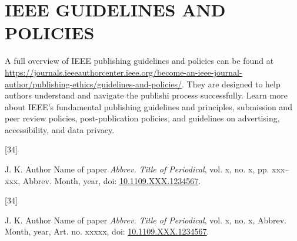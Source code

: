 \documentclass{IEEEtaes}
\begin{document}
\section{IEEE GUIDELINES AND POLICIES}

A full overview of IEEE publishing guidelines and policies can be found
at \href{https://journals.ieeeauthorcenter.ieee.org/become-an-ieee-journal-author/publishing-ethics/guidelines-and-policies/}{\url{https://journals.ieeeauthorcenter.ieee.org/become-an-ieee-journal-author/publishing-ethics/guidelines-and-policies/}}. They are designed to help authors understand and navigate the publishi process successfully. Learn more about IEEE's fundamental publishing guidelines and principles, submission and peer review policies, post-publication policies, and guidelines on advertising, accessibility, and data privacy.


\vspace*{-12pt}
\def\refname{}
\begin{thebibliography}{[34]}
\item[]  J. K. Author
\newblock Name of paper
\newblock \emph{Abbrev. Title of Periodical}, vol. x, no. x, pp. xxx--xxx, Abbrev. Month, year, doi: \href{https://dx.doi.org/10.1109.XXX.1234567}{10.1109.XXX.1234567}.
\end{thebibliography}

\def\refname{}
\begin{thebibliography}{[34]}\vspace*{-12pt}
\item[] J. K. Author
\newblock Name of paper
\newblock \emph{Abbrev. Title of Periodical}, vol. x, no. x, Abbrev. Month, year, Art. no. xxxxx, doi: \href{https://dx.doi.org/10.1109.XXX.1234567}{10.1109.XXX.1234567}.
\end{thebibliography}
\end{document}
